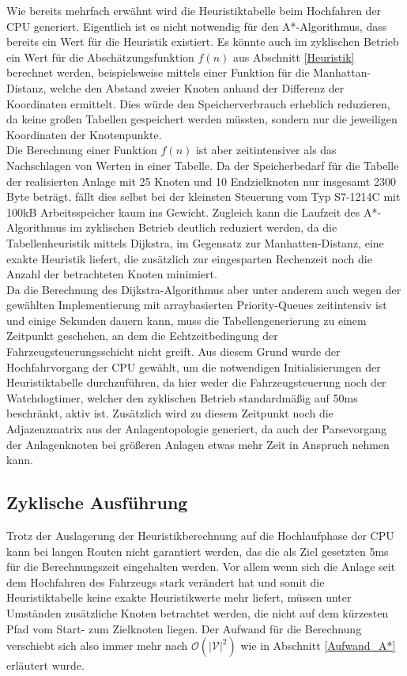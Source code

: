 			Wie bereits mehrfach erwähnt wird die Heuristiktabelle beim Hochfahren der CPU generiert. Eigentlich ist es nicht notwendig für den A*-Algorithmus, dass bereits ein Wert für die Heuristik existiert. Es könnte auch im zyklischen Betrieb ein Wert für die Abschätzungsfunktion $f(n)$ aus Abschnitt \ref{Heuristik} berechnet werden, beispielsweise mittels einer Funktion für die Manhattan-Distanz, welche den Abstand zweier Knoten anhand der Differenz der Koordinaten ermittelt. Dies würde den Speicherverbrauch erheblich reduzieren, da keine großen Tabellen gespeichert werden müssten, sondern nur die jeweiligen Koordinaten der Knotenpunkte.\\
			
			Die Berechnung einer Funktion $f(n)$ ist aber zeitintensiver als das Nachschlagen von Werten in einer Tabelle. Da der Speicherbedarf für die Tabelle der realisierten Anlage mit 25 Knoten und 10 Endzielknoten nur insgesamt 2300 Byte beträgt, fällt dies selbst bei der kleinsten Steuerung vom Typ S7-1214C mit 100kB Arbeitsspeicher kaum ins Gewicht. Zugleich kann die Laufzeit des A*-Algorithmus im zyklischen Betrieb deutlich reduziert werden, da die Tabellenheuristik mittels Dijkstra, im Gegensatz zur Manhatten-Distanz, eine exakte Heuristik liefert, die zusätzlich zur eingesparten Rechenzeit noch die Anzahl der betrachteten Knoten minimiert.\\
			
			Da die Berechnung des Dijkstra-Algorithmus aber unter anderem auch wegen der gewählten Implementierung mit arraybasierten Priority-Queues zeitintensiv ist\cite{BorisCherkassky1993} und einige Sekunden dauern kann, muss die Tabellengenerierung zu einem Zeitpunkt geschehen, an dem die Echtzeitbedingung der Fahrzeugsteuerungsschicht nicht greift. Aus diesem Grund wurde der Hochfahrvorgang der CPU gewählt, um die notwendigen Initialisierungen der Heuristiktabelle durchzuführen, da hier weder die Fahrzeugsteuerung noch der Watchdogtimer, welcher den zyklischen Betrieb standardmäßig auf 50ms beschränkt, aktiv ist. Zusätzlich wird zu diesem Zeitpunkt noch die Adjazenzmatrix aus der Anlagentopologie generiert, da auch der Parsevorgang der Anlagenknoten bei größeren Anlagen etwas mehr Zeit in Anspruch nehmen kann.
				
		\subsection{Zyklische Ausführung}
		
			Trotz der Auslagerung der Heuristikberechnung auf die Hochlaufphase der CPU kann bei langen Routen nicht garantiert werden, das die als Ziel gesetzten 5ms für die Berechnungszeit eingehalten werden. Vor allem wenn sich die Anlage seit dem Hochfahren des Fahrzeugs stark verändert hat und somit die Heuristiktabelle keine exakte Heuristikwerte mehr liefert, müssen unter Umständen zusätzliche Knoten betrachtet werden, die nicht auf dem kürzesten Pfad vom Start- zum Zielknoten liegen. Der Aufwand für die Berechnung verschiebt sich also immer mehr nach $\mathcal{O}(|\mathcal{V}|^2)$ wie in Abschnitt \ref{Aufwand_A*} erläutert wurde.\\
			

